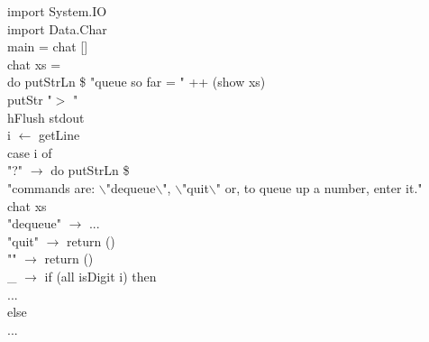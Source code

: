 \documentclass[11pt]{article}
\begin{document}
{\begin{program**}
\>  import System.IO \\
\>  import Data.Char \vspace{.125in}\\
\>  main = chat []  \vspace{.125in}\\
\>  chat xs =  \\
\>      do putStrLn \$ "queue so far = " ++ (show xs)  \\
\>          putStr "$>$  " \\
\>          hFlush stdout \\
\>          i $\leftarrow$ getLine \\
\>          case i of  \\
\>            "?" $\rightarrow$ do putStrLn \$ \\
\>                         "commands are: $\backslash$"dequeue$\backslash$", $\backslash$"quit$\backslash$" or, to queue up a number, enter it." \\
\>                        chat xs \\
\>            "dequeue" $\rightarrow$  ... \\
\>            "quit" $\rightarrow$ return () \\
\>            "" $\rightarrow$ return () \\
\>            \_ $\rightarrow$ if (all isDigit i) then  \\
\>                   ... \\
\>                 else \\
\>                   ...
\end{program**}

}




\end{document}
